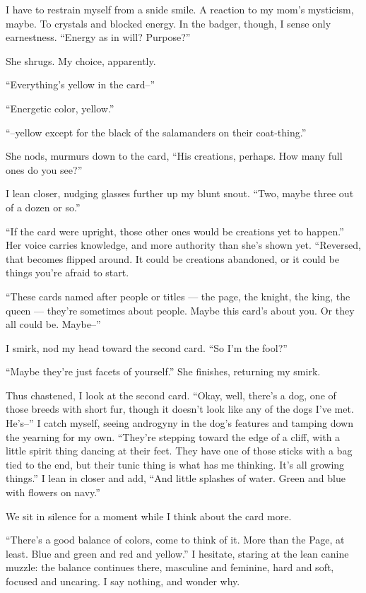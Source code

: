 I have to restrain myself from a snide smile. A reaction to my mom's mysticism, maybe. To crystals and blocked energy. In the badger, though, I sense only earnestness. ``Energy as in will? Purpose?''

She shrugs. My choice, apparently.

``Everything's yellow in the card--''

``Energetic color, yellow.''

``--yellow except for the black of the salamanders on their coat-thing.''

She nods, murmurs down to the card, ``His creations, perhaps. How many full ones do you see?''

I lean closer, nudging glasses further up my blunt snout. ``Two, maybe three out of a dozen or so.''

``If the card were upright, those other ones would be creations yet to happen.'' Her voice carries knowledge, and more authority than she's shown yet. ``Reversed, that becomes flipped around. It could be creations abandoned, or it could be things you're afraid to start.

``These cards named after people or titles --- the page, the knight, the king, the queen --- they're sometimes about people. Maybe this card's about you. Or they all could be. Maybe--''

I smirk, nod my head toward the second card. ``So I'm the fool?''

``Maybe they're just facets of yourself.'' She finishes, returning my smirk.

Thus chastened, I look at the second card. ``Okay, well, there's a dog, one of those breeds with short fur, though it doesn't look like any of the dogs I've met. He's--'' I catch myself, seeing androgyny in the dog's features and tamping down the yearning for my own. ``They're stepping toward the edge of a cliff, with a little spirit thing dancing at their feet. They have one of those sticks with a bag tied to the end, but their tunic thing is what has me thinking. It's all growing things.'' I lean in closer and add, ``And little splashes of water. Green and blue with flowers on navy.''

We sit in silence for a moment while I think about the card more.

``There's a good balance of colors, come to think of it. More than the Page, at least. Blue and green and red and yellow.'' I hesitate, staring at the lean canine muzzle: the balance continues there, masculine and feminine, hard and soft, focused and uncaring. I say nothing, and wonder why.

